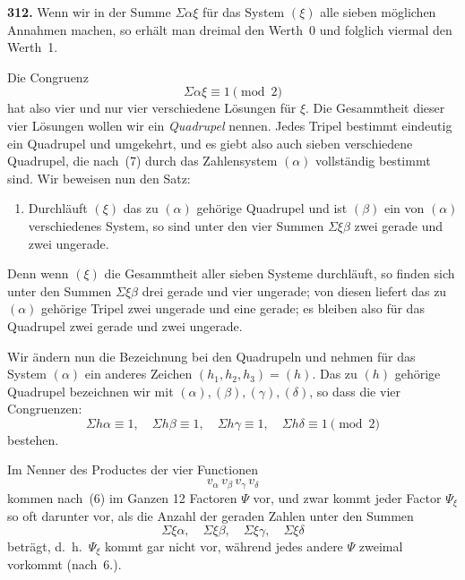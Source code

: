 \documentclass[12pt,a4paper]{article}
\begin{document}
\bigskip
\noindent\textbf{312.} Wenn wir in der Summe $\Sigma\alpha\xi$ f\"ur das System $(\xi)$ alle sieben m\"oglichen Annahmen machen, so erh\"alt man dreimal den Werth~0 und folglich viermal den Werth~1.

Die Congruenz
\begin{equation}
\tag{7}
\Sigma\alpha\xi \equiv 1 \pmod 2
\end{equation}
hat also vier und nur vier verschiedene L\"osungen f\"ur $\xi$. Die Gesammtheit dieser vier L\"osungen wollen wir ein \emph{Quadrupel} nennen. Jedes Tripel bestimmt eindeutig ein Quadrupel und umgekehrt, und es giebt also auch sieben verschiedene Quadrupel, die nach~(7) durch das Zahlensystem $(\alpha)$ vollst\"andig bestimmt sind. Wir beweisen nun den Satz:

\begin{enumerate}
\item[6.] Durchl\"auft $(\xi)$ das zu $(\alpha)$ geh\"orige Quadrupel und ist $(\beta)$ ein von $(\alpha)$ verschiedenes System, so sind unter den vier Summen $\Sigma\xi\beta$ zwei gerade und zwei ungerade.
\end{enumerate}

Denn wenn $(\xi)$ die Gesammtheit aller sieben Systeme durchl\"auft, so finden sich unter den Summen $\Sigma\xi\beta$ drei gerade und vier ungerade; von diesen liefert das zu $(\alpha)$ geh\"orige Tripel zwei ungerade und eine gerade; es bleiben also f\"ur das Quadrupel zwei gerade und zwei ungerade.

Wir \"andern nun die Bezeichnung bei den Quadrupeln und nehmen f\"ur das System $(\alpha)$ ein anderes Zeichen $(h_1,h_2,h_3)=(h)$. Das zu $(h)$ geh\"orige Quadrupel bezeichnen wir mit $(\alpha),(\beta),(\gamma),(\delta)$, so dass die vier Congruenzen:
\begin{equation}
\tag{8}
\Sigma h\alpha \equiv 1,\quad \Sigma h\beta \equiv 1,\quad \Sigma h\gamma \equiv 1,\quad \Sigma h\delta \equiv 1 \pmod 2
\end{equation}
bestehen.

Im Nenner des Productes der vier Functionen
\[
v_{\alpha}\,v_{\beta}\,v_{\gamma}\,v_{\delta}
\]
kommen nach~(6) im Ganzen 12 Factoren $\Psi$ vor, und zwar kommt jeder Factor $\Psi_{\xi}$ so oft darunter vor, als die Anzahl der geraden Zahlen unter den Summen
\[
\Sigma\xi\alpha,\quad \Sigma\xi\beta,\quad \Sigma\xi\gamma,\quad \Sigma\xi\delta
\]
betr\"agt, d.~h.\ $\Psi_{\xi}$ kommt gar nicht vor, w\"ahrend jedes andere $\Psi$ zweimal vorkommt (nach~6.).
\end{document}
